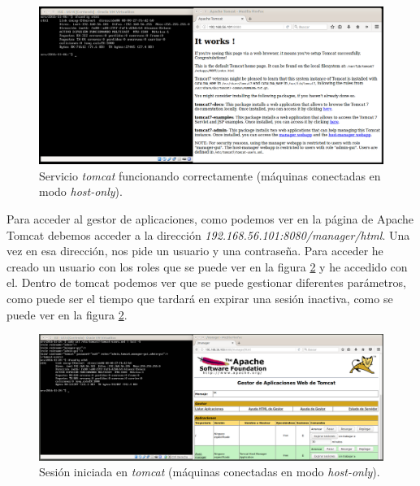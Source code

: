 \documentclass[a4paper,titlepage,12pt]{scrartcl}	%
\numberwithin{figure}{section} %
\numberwithin{table}{section} %
\begin{document}
	\begin{figure}[H]
		\includegraphics[width=\linewidth]{./Imagenes/O4-tomcat.png}
		\vspace{-0.5cm}
		\caption[Servicio \textit{tomcat} funcionando correctamente (máquinas conectadas en modo \textit{host-only}).]{Servicio \textit{tomcat} funcionando correctamente (máquinas conectadas en modo \textit{host-only}).}
		\label{O4-tomcat}
	\end{figure}

	Para acceder al gestor de aplicaciones, como podemos ver en la página de Apache Tomcat \cite{apachetomcatmanager} debemos acceder a la dirección \textit{192.168.56.101:8080/manager/html}. Una vez en esa dirección, nos pide un usuario y una contraseña. Para acceder he creado un usuario con los roles que se puede ver en la figura \ref{O4-tomcat2} y he accedido con el. Dentro de tomcat podemos ver que se puede gestionar diferentes parámetros, como puede ser el tiempo que tardará en expirar una sesión inactiva, como se puede ver en la figura \ref{O4-tomcat2}.
	
	\begin{figure}[H]
		\includegraphics[width=\linewidth]{./Imagenes/O4-tomcat2.png}
		\vspace{-0.5cm}
		\caption[Sesión iniciada en \textit{tomcat} (máquinas conectadas en modo \textit{host-only}).]{Sesión iniciada en \textit{tomcat} (máquinas conectadas en modo \textit{host-only}).}
		\label{O4-tomcat2}
	\end{figure}
	
\end{document}
